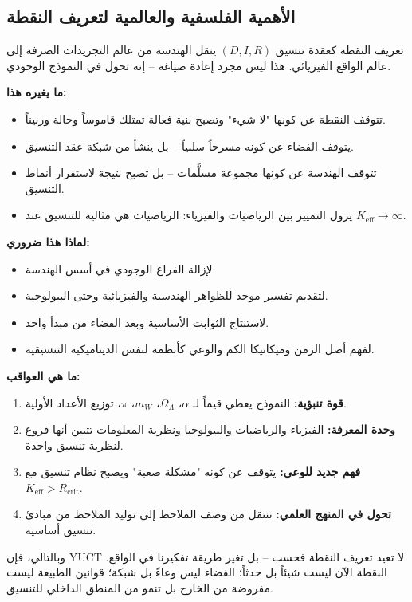 \documentclass[12pt,a4paper]{article}
\newcommand{\Keff}{K_{\mathrm{eff}}}
\newcommand{\Rcrit}{R_{\mathrm{crit}}}
\begin{document}
	\subsection*{الأهمية الفلسفية والعالمية لتعريف النقطة}
	
	تعريف النقطة كعقدة تنسيق \((D, I, R)\) ينقل الهندسة من عالم التجريدات الصرفة إلى عالم الواقع الفيزيائي. هذا ليس مجرد إعادة صياغة – إنه تحول في النموذج الوجودي.
	
	\medskip
	\textbf{ما يغيره هذا:}
	\begin{itemize}
		\item تتوقف النقطة عن كونها "لا شيء" وتصبح بنية فعالة تمتلك قاموساً وحالة ورنيناً.
		\item يتوقف الفضاء عن كونه مسرحاً سلبياً – بل ينشأ من شبكة عقد التنسيق.
		\item تتوقف الهندسة عن كونها مجموعة مسلَّمات – بل تصبح نتيجة لاستقرار أنماط التنسيق.
		\item يزول التمييز بين الرياضيات والفيزياء: الرياضيات هي مثالية للتنسيق عند \(\Keff \to \infty\).
	\end{itemize}
	
	\medskip
	\textbf{لماذا هذا ضروري:}
	\begin{itemize}
		\item لإزالة الفراغ الوجودي في أسس الهندسة.
		\item لتقديم تفسير موحد للظواهر الهندسية والفيزيائية وحتى البيولوجية.
		\item لاستنتاج الثوابت الأساسية وبعد الفضاء من مبدأ واحد.
		\item لفهم أصل الزمن وميكانيكا الكم والوعي كأنظمة لنفس الديناميكية التنسيقية.
	\end{itemize}
	
	\medskip
	\textbf{ما هي العواقب:}
	\begin{enumerate}
		\item \textbf{قوة تنبؤية:} النموذج يعطي قيماً لـ \(\alpha\)، \(\Omega_\Lambda\)، \(m_W\)، \(\pi\)، توزيع الأعداد الأولية.
		\item \textbf{وحدة المعرفة:} الفيزياء والرياضيات والبيولوجيا ونظرية المعلومات تتبين أنها فروع لنظرية تنسيق واحدة.
		\item \textbf{فهم جديد للوعي:} يتوقف عن كونه "مشكلة صعبة" ويصبح نظام تنسيق مع \(\Keff > \Rcrit\).
		\item \textbf{تحول في المنهج العلمي:} ننتقل من وصف الملاحظ إلى توليد الملاحظ من مبادئ تنسيق أساسية.
	\end{enumerate}
	
	\medskip
	وبالتالي، فإن YUCT لا تعيد تعريف النقطة فحسب – بل تغير طريقة تفكيرنا في الواقع. النقطة الآن ليست شيئاً بل حدثاً؛ الفضاء ليس وعاءً بل شبكة؛ قوانين الطبيعة ليست مفروضة من الخارج بل تنمو من المنطق الداخلي للتنسيق.
	
\end{document}
